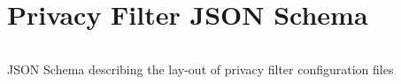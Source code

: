 \section{Privacy Filter JSON Schema}
\label{appendix:privacy-filter-jsonschema}

\begin{code}
\inputminted[linenos,tabsize=2,breaklines]{json}{code/privacy-filter-json-schema.json}
\caption{JSON Schema describing the lay-out of privacy filter configuration files}
\label{listing:privacy-filter-jsonschema}
\end{code}